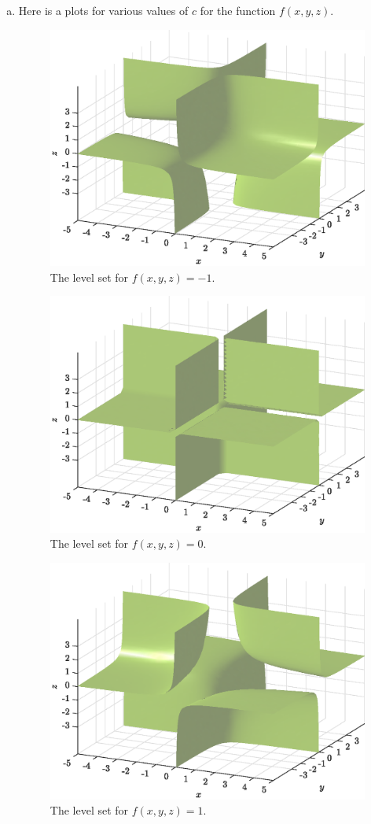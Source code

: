 \documentclass[12pt]{article} %
\begin{document}
\begin{solution}
\begin{enumerate}[(a)]
    \item Here is a plots for various values of $c$ for the function $f(x,y,z)$.
    \begin{figure}[H]
    \centering
        \includegraphics[width=.8\textwidth]{figures/5b_-1}
        \caption{The level set for $f(x,y,z)=-1$.}
    \end{figure}
    \begin{figure}[H]
    \centering
        \includegraphics[width=.8\textwidth]{figures/5b_0}
        \caption{The level set for $f(x,y,z)=0$.}
    \end{figure}
    \begin{figure}[H]
    \centering
        \includegraphics[width=.8\textwidth]{figures/5b_1}
        \caption{The level set for $f(x,y,z)=1$.}
    \end{figure}

\end{enumerate}
\end{solution}
\end{document}
